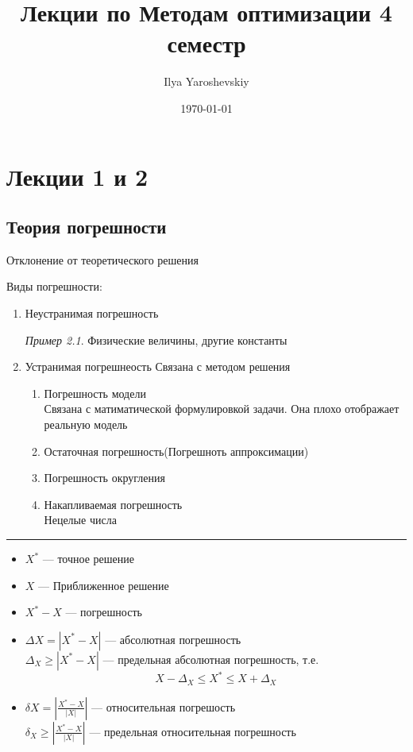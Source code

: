 \documentclass[oneside]{book}
\author{Ilya Yaroshevskiy}
\date{\today}
\title{Лекции по Методам оптимизации 4 семестр}
\theoremstyle{plain}
\theoremstyle{remark}
\newtheorem*{examp}{Пример}
\theoremstyle{definition}
\begin{document}
\maketitle
\tableofcontents


\chapter{}
\label{sec:orgc415624}
\chapter{Лекции 1 и 2}
\label{sec:orge8f48a6}
\section{Теория погрешности}
\label{sec:orgf749d4b}
\begin{defintion}
Отклонение от теоретического решения
\end{defintion}
Виды погрешности:
\begin{enumerate}
\item Неустранимая погрешность
\begin{examp}
Физические величины, другие константы
\end{examp}
\item Устранимая погрешнеость
Связана с методом решения
\begin{enumerate}
\item Погрешность модели \\
Связана с матиматической формулировкой задачи. Она плохо отображает реальную модель
\item Остаточная погрешность(Погрешноть аппроксимации)
\item Погрешность округления
\item Накапливаемая погрешность \\
Нецелые числа
\end{enumerate}
\end{enumerate}

\noindent\rule{\textwidth}{0.5pt}

\begin{itemize}
\item \(X^*\) --- точное решение \\
\item \(X\) --- Приближенное решение
\item \(X^* - X\) --- погрешность
\item \(\Delta X = |X^* - X|\) --- абсолютная погрешность \\
\(\Delta_X \ge |X^* - X|\) --- предельная абсолютная погрешность, т.е. \[ X - \Delta_X \le X^* \le X + \Delta_X \]
\item \(\delta X = \left|\frac{X^* - X}{|X|}\right|\) --- относительная погрешость \\
\(\delta_X \ge \left|\frac{X^* - X}{|X|}\right|\) --- предельная относительная погрешность
\end{itemize}
\end{document}

